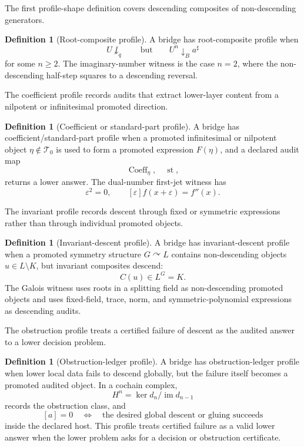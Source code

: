 \documentclass[11pt]{article}
\theoremstyle{definition}
\newtheorem{definition}[theorem]{Definition}
\begin{document}
The first profile-shape definition covers descending composites of
non-descending generators.

\begin{definition}[Root-composite profile]
\label{def:sau-root-profile}
A bridge has root-composite profile when
\[
U\not\downarrow_q
\qquad\text{but}\qquad
U^n\downarrow_B a^\sharp
\]
for some \(n\ge2\). The imaginary-number witness is the case \(n=2\), where the non-descending half-step squares to a descending reversal.
\end{definition}

The coefficient profile records audits that extract lower-layer content from a
nilpotent or infinitesimal promoted direction.

\begin{definition}[Coefficient or standard-part profile]
\label{def:sau-coeff-profile}
A bridge has coefficient/standard-part profile when a promoted infinitesimal or nilpotent object \(\eta\notin\mathcal T_0\) is used to form a promoted expression \(F(\eta)\), and a declared audit map
\[
\operatorname{Coeff}_\eta,\quad \operatorname{st},
\]
returns a lower answer. The dual-number first-jet witness has
\[
\varepsilon^2=0,
\qquad
[\varepsilon]f(x+\varepsilon)=f''(x).
\]
\end{definition}

The invariant profile records descent through fixed or symmetric expressions
rather than through individual promoted objects.

\begin{definition}[Invariant-descent profile]
\label{def:sau-invariant-profile}
A bridge has invariant-descent profile when a promoted symmetry structure \(G\curvearrowright L\) contains non-descending objects \(u\in L\setminus K\), but invariant composites descend:
\[
C(u)\in L^G=K.
\]
The Galois witness uses roots in a splitting field as non-descending promoted objects and uses fixed-field, trace, norm, and symmetric-polynomial expressions as descending audits.
\end{definition}

The obstruction profile treats a certified failure of descent as the audited
answer to a lower decision problem.

\begin{definition}[Obstruction-ledger profile]
\label{def:sau-obstruction-profile}
A bridge has obstruction-ledger profile when lower local data fails to descend globally, but the failure itself becomes a promoted audited object. In a cochain complex,
\[
H^n=\ker d_n/\operatorname{im}d_{n-1}
\]
records the obstruction class, and
\[
[a]=0
\quad\Longleftrightarrow\quad
\text{the desired global descent or gluing succeeds}
\]
inside the declared host. This profile treats certified failure as a valid lower answer when the lower problem asks for a decision or obstruction certificate.
\end{definition}
\end{document}
